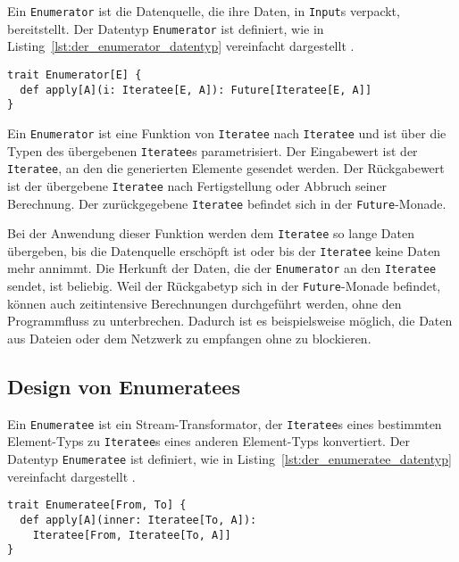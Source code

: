 Ein \lstinline|Enumerator| ist die Datenquelle, die ihre Daten, in \lstinline|Input|s verpackt, bereitstellt.
Der Datentyp \lstinline|Enumerator| ist definiert, wie in Listing~\ref{lst:der_enumerator_datentyp} vereinfacht dargestellt \cite[vgl.][]{play_enumerator_source_code}.
\begin{lstlisting}[caption=Der Enumerator-Datentyp, label=lst:der_enumerator_datentyp]
trait Enumerator[E] {
  def apply[A](i: Iteratee[E, A]): Future[Iteratee[E, A]]
}
\end{lstlisting}

Ein \lstinline|Enumerator| ist eine Funktion von \lstinline|Iteratee| nach \lstinline|Iteratee| und ist über die Typen des übergebenen \lstinline|Iteratee|s parametrisiert.
Der Eingabewert ist der \lstinline|Iteratee|, an den die generierten Elemente gesendet werden.
Der Rückgabewert ist der übergebene \lstinline|Iteratee| nach Fertigstellung oder Abbruch seiner Berechnung.
Der zurückgegebene \lstinline|Iteratee| befindet sich in der \lstinline|Future|-Monade.

Bei der Anwendung dieser Funktion werden dem \lstinline|Iteratee| so lange Daten übergeben, bis die Datenquelle erschöpft ist oder bis der \lstinline|Iteratee| keine Daten mehr annimmt.
Die Herkunft der Daten, die der \lstinline|Enumerator| an den \lstinline|Iteratee| sendet, ist beliebig.
Weil der Rückgabetyp sich in der \lstinline|Future|-Monade befindet, können auch zeitintensive Berechnungen durchgeführt werden, ohne den Programmfluss zu unterbrechen.
Dadurch ist es beispielsweise möglich, die Daten aus Dateien oder dem Netzwerk zu empfangen ohne zu blockieren.



\subsection{Design von Enumeratees} %
\label{sub:design_enumeratees}

Ein \lstinline|Enumeratee| ist ein Stream-Transformator, der \lstinline|Iteratee|s eines bestimmten Element-Typs zu \lstinline|Iteratee|s eines anderen Element-Typs konvertiert.
Der Datentyp \lstinline|Enumeratee| ist definiert, wie in Listing~\ref{lst:der_enumeratee_datentyp} vereinfacht dargestellt \cite[vgl.][]{play_enumeratee_source_code}.
\begin{lstlisting}[caption=Der Enumeratee-Datentyp, label=lst:der_enumeratee_datentyp]
trait Enumeratee[From, To] {
  def apply[A](inner: Iteratee[To, A]):
    Iteratee[From, Iteratee[To, A]]
}
\end{lstlisting}

